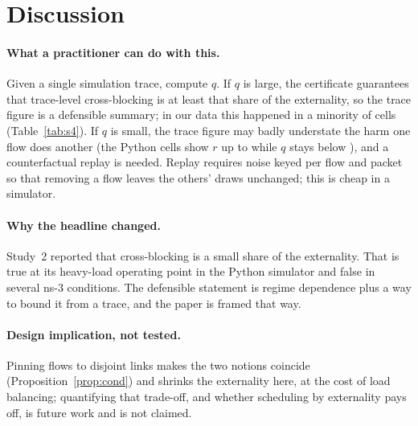 \documentclass[11pt]{article}
\begin{document}
\section{Discussion}
\paragraph{What a practitioner can do with this.} Given a single simulation trace, compute $q$. If $q$ is large, the certificate guarantees that trace-level cross-blocking is at least that share of the externality, so the trace figure is a defensible summary; in our data this happened in a minority of cells (Table~\ref{tab:s4}). If $q$ is small, the trace figure may badly understate the harm one flow does another (the Python cells show $r$ up to \FourPyRMax{} while $q$ stays below \FourPyQMax{}), and a counterfactual replay is needed. Replay requires noise keyed per flow and packet so that removing a flow leaves the others' draws unchanged; this is cheap in a simulator.
\paragraph{Why the headline changed.} Study~2 reported that cross-blocking is a small share of the externality. That is true at its heavy-load operating point in the Python simulator and false in several ns-3 conditions. The defensible statement is regime dependence plus a way to bound it from a trace, and the paper is framed that way.
\paragraph{Design implication, not tested.} Pinning flows to disjoint links makes the two notions coincide (Proposition~\ref{prop:cond}) and shrinks the externality here, at the cost of load balancing; quantifying that trade-off, and whether scheduling by externality pays off, is future work and is not claimed.
\end{document}

